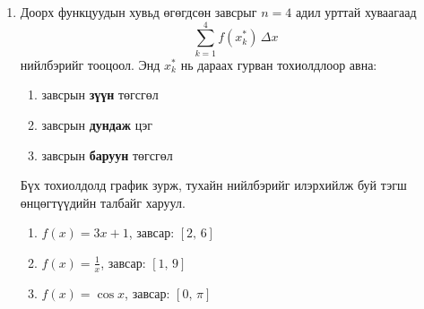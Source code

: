 \begin{enumerate}
    \item Доорх функцуудын хувьд өгөгдсөн завсрыг 
$n=4$ адил урттай хуваагаад 
\[
\sum_{k=1}^4 f(x_k^*)\,\Delta x
\]
 нийлбэрийг тооцоол.
Энд $x_k^*$ нь дараах гурван тохиолдлоор авна:
\begin{enumerate}
\item[a)]  завсрын \textbf{зүүн} төгсгөл
\item[b)]  завсрын \textbf{дундаж} цэг
\item[c)]  завсрын \textbf{баруун} төгсгөл
\end{enumerate}

Бүх тохиолдолд график зурж, тухайн нийлбэрийг илэрхийлж буй тэгш өнцөгтүүдийн талбайг харуул.
\begin{enumerate}
\item $f(x)=3x+1$, \quad завсар: $[2,\,6]$

\item $f(x)=\frac{1}{x}$, \quad завсар: $[1,\,9]$

\item $f(x)=\cos x$, \quad завсар: $[0,\,\pi]$


\end{enumerate}
\end{enumerate}
